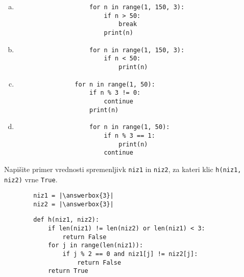 \documentclass[arhiv, 10pt]{../izpit}
\newcommand{\inlinepy}[1]{\texttt{#1}}
\newcommand{\answerbox}[1]{\framebox{\vphantom{\large M}\hspace{#1cm}}}
\begin{document}
        \begin{multicols}{2}
        \begin{enumerate}[(a)]
\item 
                \begin{verbatim}
                    for n in range(1, 150, 3):
                        if n > 50:
                            break
                        print(n)
                \end{verbatim}
            
\item 
                \begin{verbatim}
                    for n in range(1, 150, 3):
                        if n < 50:
                            print(n)
                \end{verbatim}
            
\item 
            \begin{verbatim}
                for n in range(1, 50):
                    if n % 3 != 0:
                        continue
                    print(n)
            \end{verbatim}
        
\item 
                \begin{verbatim}
                    for n in range(1, 50):
                        if n % 3 == 1:
                            print(n)
                        continue
                \end{verbatim}
            
\end{enumerate}

        \end{multicols}
    
        \naloga*
        \begin{multicols}{2}
        \noindent
        Napišite primer vrednosti spremenljivk \inlinepy{niz1} in \inlinepy{niz2}, za kateri klic \inlinepy{h(niz1, niz2)} vrne \inlinepy{True}.
        \begin{verbatim}
        niz1 = |\answerbox{3}|
        niz2 = |\answerbox{3}|
        \end{verbatim}
        \vfil
        \columnbreak
        \begin{verbatim}
        def h(niz1, niz2):
            if len(niz1) != len(niz2) or len(niz1) < 3:
                return False
            for j in range(len(niz1)):
                if j % 2 == 0 and niz1[j] != niz2[j]:
                    return False
            return True
        \end{verbatim}
        \end{multicols}
    
\end{document}
